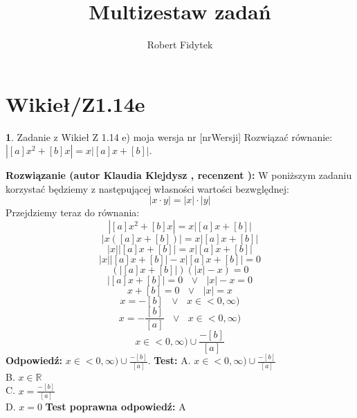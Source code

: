 \documentclass[12pt, a4paper]{article}
\title{Multizestaw zadań}
\author{Robert Fidytek}
\date{}
\theoremstyle{definition} %
\newtheorem{zad}{}
\newcommand{\kategoria}[1]{\section{#1}} %
\newcommand{\zadStart}[1]{\begin{zad}#1\newline} %
\newcommand{\zadStop}{\end{zad}}   %
\newcommand{\rozwStart}[2]{\noindent \textbf{Rozwiązanie (autor #1 , recenzent #2): }\newline} %
\newcommand{\rozwStop}{\newline}                                            %
\newcommand{\odpStart}{\noindent \textbf{Odpowiedź:}\newline}    %
\newcommand{\odpStop}{\newline}                                             %
\newcommand{\testStart}{\noindent \textbf{Test:}\newline} %
\newcommand{\testStop}{\newline} %
\newcommand{\kluczStart}{\noindent \textbf{Test poprawna odpowiedź:}\newline} %
\newcommand{\kluczStop}{\newline} %
\begin{document}
\maketitle


\kategoria{Wikieł/Z1.14e}
\zadStart{Zadanie z Wikieł Z 1.14 e) moja wersja nr [nrWersji]}
Rozwiązać równanie: $
|[a]x^2+[b]x|=x|[a]x+[b]|$.
\zadStop
\rozwStart{Klaudia Klejdysz}{}
W poniższym zadaniu korzystać będziemy z następującej własności wartości bezwględnej:
\begin{equation*}
|x\cdot y|=|x|\cdot|y|
\end{equation*}
Przejdziemy teraz do równania:
\begin{equation*}
|[a]x^2+[b]x|=x|[a]x+[b]|
\end{equation*}
\begin{equation*}
|x([a]x+[b])|=x|[a]x+[b]|
\end{equation*}
\begin{equation*}
|x||[a]x+[b]|=x|[a]x+[b]|
\end{equation*}
\begin{equation*}
|x||[a]x+[b]|-x|[a]x+[b]|=0
\end{equation*}
\begin{equation*}
(|[a]x+[b]|)(|x|-x)=0
\end{equation*}
\begin{equation*}
|[a]x+[b]|=0\text{ }\lor\text{ }|x|-x=0
\end{equation*}
\begin{equation*}
[a]x+[b]=0\text{ }\lor\text{ }|x|=x
\end{equation*}
\begin{equation*}
[a]x=-[b]\text{ }\lor\text{ }x\in<0,\infty)
\end{equation*}
\begin{equation*}
x=-\frac{[b]}{[a]}\text{ }\lor\text{ }x\in<0,\infty)
\end{equation*}
\begin{equation*}
x\in<0,\infty)\cup\frac{-[b]}{[a]}
\end{equation*}
\rozwStop
\odpStart
$x\in<0,\infty)\cup\frac{-[b]}{[a]}$.
\odpStop
\testStart
A. $x\in<0,\infty)\cup\frac{-[b]}{[a]}$\\
B. $x\in\mathbb{R}$\\
C. $x=\frac{-[b]}{[a]}$\\
D. $x=0$
\testStop
\kluczStart
A
\kluczStop
\end{document}
